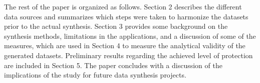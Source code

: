 The rest of the paper is organized as follows. Section 2 describes the different data sources and summarizes which steps were taken to harmonize the datasets prior to the actual synthesis. Section 3 provides some background on the synthesis methods, limitations in the applications, and a discussion of some of the measures, which are used in Section 4 to measure the analytical validity of the generated datasets. Preliminary results regarding the achieved level of protection are included in Section 5. The paper concludes with a discussion of the implications of the study for future data synthesis projects.
